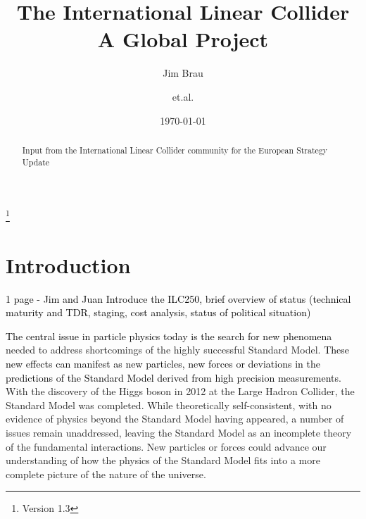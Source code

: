 \documentclass[%
 reprint,
 amsmath,amssymb,
 aps,
]{revtex4-1}
\newcommand{\juan}[1]{\textcolor{black}{{#1}}}
\newcommand{\todo}[1]{\textcolor{black}{{#1}}}
\begin{document}

\title{The International Linear Collider \\ A Global Project}%
\thanks{Version 1.3}%

\author{Jim Brau}
\author{et.al.}%
%


\date{\today}%

\begin{abstract}
Input from the International Linear Collider community for the European Strategy Update 

\end{abstract}

\maketitle


\section{\label{sec:intro}Introduction}

\todo{ 1 page - Jim and Juan
 Introduce the ILC250, brief overview of status (technical maturity and TDR, staging, cost analysis, status of political situation) }

\juan{The central issue in particle physics today is the search for new phenomena} needed to address shortcomings of the highly successful Standard Model.  \juan{These new effects can manifest as new particles, new forces or deviations in the predictions of the Standard Model derived from high precision measurements.}
With the discovery of the Higgs boson in 2012 at the Large Hadron Collider,
the Standard Model was completed.  
While theoretically self-consistent, with
no evidence of physics beyond the Standard Model having appeared, a number of issues remain
unaddressed, leaving the Standard Model as an incomplete theory of the fundamental
interactions.  New particles or forces could advance our understanding
of how the physics of the Standard Model fits into a more complete
picture of the nature of the universe.
\end{document}
